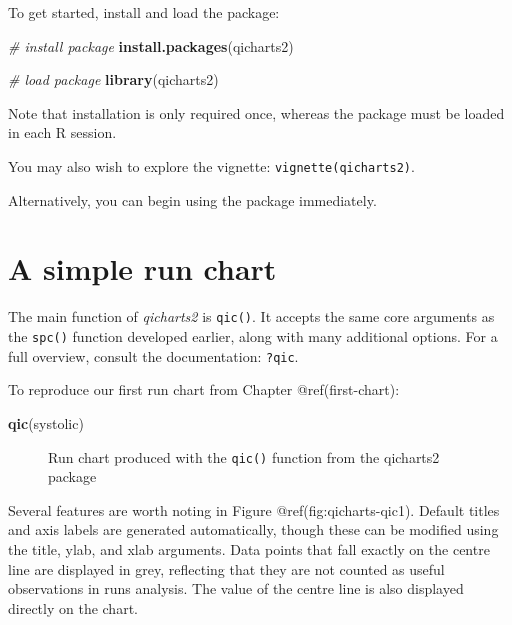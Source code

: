 \documentclass[
]{book}
\makeatletter
\newenvironment{Shaded}{\begin{snugshade}}{\end{snugshade}}
\newcommand{\CommentTok}[1]{\textcolor[rgb]{0.56,0.35,0.01}{\textit{#1}}}
\newcommand{\FunctionTok}[1]{\textcolor[rgb]{0.13,0.29,0.53}{\textbf{#1}}}
\newcommand{\NormalTok}[1]{#1}
\newcommand{\StringTok}[1]{\textcolor[rgb]{0.31,0.60,0.02}{#1}}
\newcommand*\pandocbounded[1]{%
  \sbox\pandoc@box{#1}%
  \Gscale@div\@tempa{\textheight}{\dimexpr\ht\pandoc@box+\dp\pandoc@box\relax}%
  \Gscale@div\@tempb{\linewidth}{\wd\pandoc@box}%
  \ifdim\@tempb\p@<\@tempa\p@\let\@tempa\@tempb\fi%
  \ifdim\@tempa\p@<\p@\scalebox{\@tempa}{\usebox\pandoc@box}%
  \else\usebox{\pandoc@box}%
  \fi%
}
\makeatother
\begin{document}
To get started, install and load the package:

\begin{Shaded}
\begin{Highlighting}[]
\CommentTok{\# install package}
\FunctionTok{install.packages}\NormalTok{(}\StringTok{\textquotesingle{}qicharts2\textquotesingle{}}\NormalTok{)}

\CommentTok{\# load package}
\FunctionTok{library}\NormalTok{(qicharts2)}
\end{Highlighting}
\end{Shaded}

Note that installation is only required once, whereas the package must
be loaded in each R session.

You may also wish to explore the vignette:
\texttt{vignette(\textquotesingle{}qicharts2\textquotesingle{})}.

Alternatively, you can begin using the package immediately.

\section{A simple run chart}\label{a-simple-run-chart}

The main function of \emph{qicharts2} is \texttt{qic()}. It accepts the
same core arguments as the \texttt{spc()} function developed earlier,
along with many additional options. For a full overview, consult the
documentation: \texttt{?qic}.

To reproduce our first run chart from Chapter @ref(first-chart):

\begin{Shaded}
\begin{Highlighting}[]
\FunctionTok{qic}\NormalTok{(systolic)}
\end{Highlighting}
\end{Shaded}

\begin{figure}
\centering
\pandocbounded{}
\caption{Run chart produced with the \protect\texttt{qic()} function
from the qicharts2 package}
\end{figure}

Several features are worth noting in Figure @ref(fig:qicharts-qic1).
Default titles and axis labels are generated automatically, though these
can be modified using the title, ylab, and xlab arguments. Data points
that fall exactly on the centre line are displayed in grey, reflecting
that they are not counted as useful observations in runs analysis. The
value of the centre line is also displayed directly on the chart.
\end{document}
